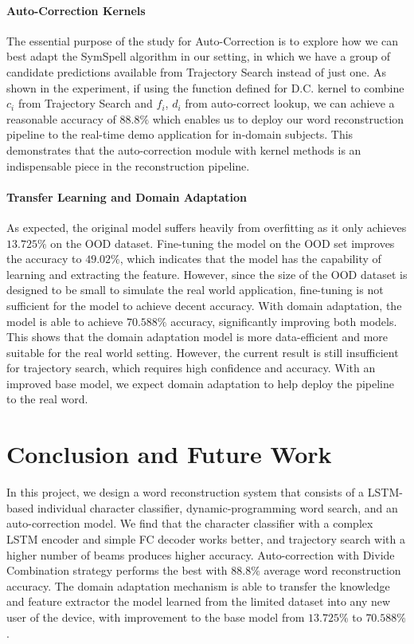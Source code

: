 \documentclass{article}
\begin{document}
\begin{multicols*}{2}
\paragraph{Auto-Correction Kernels} 
The essential purpose of the study for Auto-Correction is to explore how we can best adapt the SymSpell algorithm in our setting, in which we have a group of candidate predictions available from Trajectory Search instead of just one. As shown in the experiment, if using the function defined for D.C. kernel to combine $c_i$ from Trajectory Search and $f_i$, $d_i$ from auto-correct lookup, we can achieve a reasonable accuracy of $88.8\%$ which enables us to deploy our word reconstruction pipeline to the real-time demo application for in-domain subjects. This demonstrates that the auto-correction module with kernel methods is an indispensable piece in the reconstruction pipeline.


\paragraph{Transfer Learning and Domain Adaptation}
As expected, the original model suffers heavily from overfitting as it only achieves $13.725\%$ on the OOD dataset. Fine-tuning the model on the OOD set improves the accuracy to $49.02\%$, which indicates that the model has the capability of learning and extracting the feature. However, since the size of the OOD dataset is designed to be small to simulate the real world application, fine-tuning is not sufficient for the model to achieve decent accuracy. With domain adaptation, the model is able to achieve $70.588\%$ accuracy, significantly improving both models. This shows that the domain adaptation model is more data-efficient and more suitable for the real world setting. However, the current result is still insufficient for trajectory search, which requires high confidence and accuracy. With an improved base model, we expect domain adaptation to help deploy the pipeline to the real word.

\section{Conclusion and Future Work}
In this project, we design a word reconstruction system that consists of a LSTM-based individual character classifier, dynamic-programming word search, and an auto-correction model. We find that the character classifier with a complex LSTM encoder and simple FC decoder works better, and trajectory search with a higher number of beams produces higher accuracy. Auto-correction with Divide Combination strategy performs the best with $88.8\%$ average word reconstruction accuracy. The domain adaptation mechanism is able to transfer the knowledge and feature extractor the model learned from the limited dataset into any new user of the device, with improvement to the base model from $13.725\%$ to $70.588\%$. 


\end{multicols*}
\end{document}
